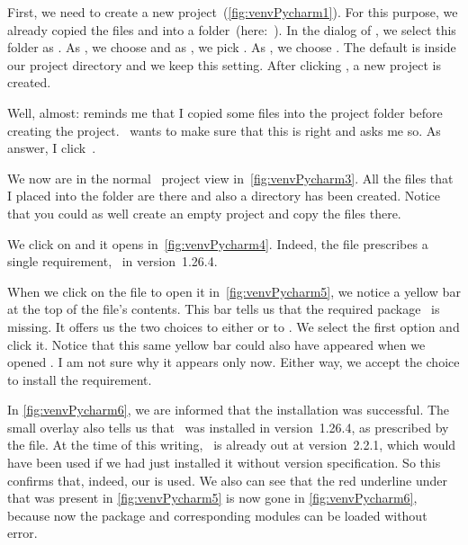 First, we need to create a new project~(\cref{fig:venvPycharm1}).
For this purpose, we already copied the files  and  into a folder~(here:~).
In the  dialog of \pycharm, we select this folder as .
As , we choose  and as , we pick .
As , we choose .
The default  is  inside our project directory and we keep this setting.
After clicking , a new project is created.

Well, almost:
 reminds me that I copied some files into the project folder before creating the project.
\pycharm\ wants to make sure that this is right and asks me so.
As answer, I click~.

We now are in the normal \pycharm\ project view in~\cref{fig:venvPycharm3}.
All the files that I placed into the folder are there and also a  directory has been created.
Notice that you could as well create an empty project and copy the files there.

We click on  and it opens in~\cref{fig:venvPycharm4}.
Indeed, the file prescribes a single requirement, \numpy\ in version~1.26.4.

When we click on the file  to open it in~\cref{fig:venvPycharm5}, we notice a yellow bar at the top of the file's contents.
This bar tells us that the required package \numpy\ is missing.
It offers us the two choices to either  or to .
We select the first option and click it.
Notice that this same yellow bar could also have appeared when we opened .
I am not sure why it appears only now.
Either way, we accept the choice to install the requirement.

In \cref{fig:venvPycharm6}, we are informed that the installation was successful.
The small overlay also tells us that \numpy\ was installed in version~1.26.4, as prescribed by the  file.
At the time of this writing, \numpy\ is already out at version~2.2.1, which would have been used if we had just installed it without version specification.
So this confirms that, indeed, our  is used.
We also can see that the red underline under  that was present in \cref{fig:venvPycharm5} is now gone in \cref{fig:venvPycharm6}, because now the package and corresponding modules can be loaded without error.

